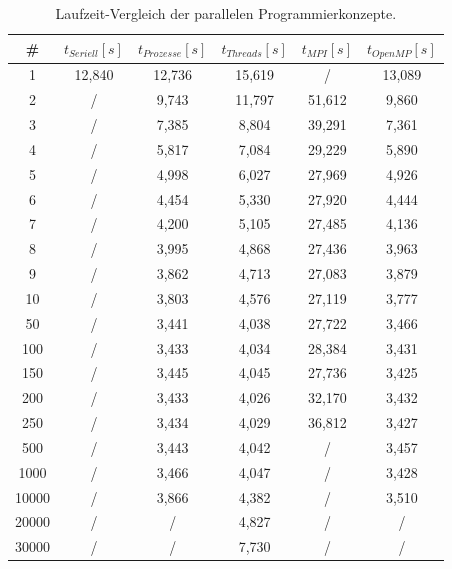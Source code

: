 				\begin{table}
					\caption{Laufzeit-Vergleich der parallelen Programmierkonzepte.}
					\begin{tabular}{c|c|c|c|c|c}
						\# & $t_{Seriell} [s]$ & $t_{Prozesse} [s]$ & $t_{Threads} [s]$ & $t_{MPI} [s]$ & $t_{OpenMP} [s]$\\
						\hline
						1 & 12,840 & 12,736 & 15,619 & / & 13,089\\
						2 & / & 9,743 & 11,797 & 51,612 & 9,860\\
						3 & / & 7,385 & 8,804 & 39,291 & 7,361\\
						4 & / & 5,817 & 7,084 & 29,229 & 5,890\\
						5 & / & 4,998 & 6,027 & 27,969 & 4,926\\
						6 & / & 4,454 & 5,330 & 27,920 & 4,444\\
						7 & / & 4,200 & 5,105 & 27,485 & 4,136\\
						8 & / & 3,995 & 4,868 & 27,436 & 3,963\\
						9 & / & 3,862 & 4,713 & 27,083 & 3,879\\
						10 & / & 3,803 & 4,576 & 27,119 & 3,777\\
						50 & / & 3,441 & 4,038 & 27,722 & 3,466\\
						100 & / & 3,433 & 4,034 & 28,384 & 3,431\\
						150 & / & 3,445 & 4,045 & 27,736 & 3,425\\
						200 & / & 3,433 & 4,026 & 32,170 & 3,432\\
						250 & / & 3,434 & 4,029 & 36,812 & 3,427\\
						500 & / & 3,443 & 4,042 & / & 3,457\\
						1000 & / & 3,466 & 4,047 & / & 3,428\\
						10000 & / & 3,866 & 4,382 & / & 3,510\\
						20000 & / & / & 4,827 & / & /\\
						30000 & / & / & 7,730 & / & /\\
					\end{tabular}
					\label{tab:LaufzeitVergleich}
				\end{table}
			

